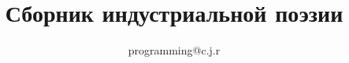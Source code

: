 \documentclass{book}
\begin{document}
\title{Сборник индустриальной поэзии}
\author{programming@c.j.r}

\maketitle


\end{document}
